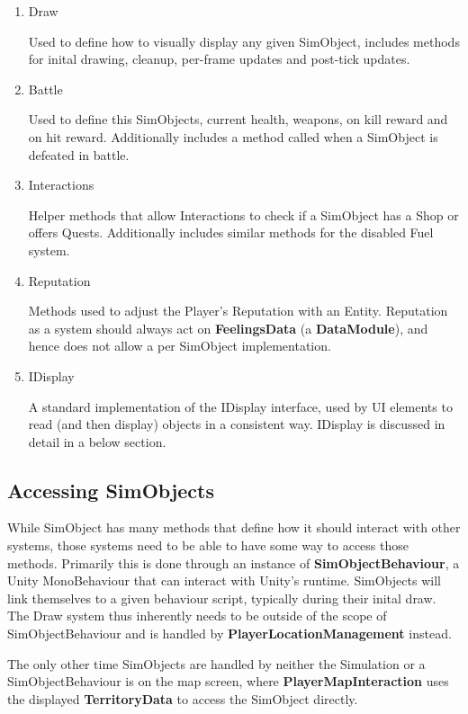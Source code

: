 \documentclass{report}
\begin{document}
\begin{enumerate}
        \item Draw

Used to define how to visually display any given SimObject, includes methods for inital drawing, cleanup, per-frame updates and post-tick updates.

        \item Battle

Used to define this SimObjects, current health, weapons, on kill reward and on hit reward. Additionally includes a method called when a SimObject is defeated in battle.

        \item Interactions

Helper methods that allow Interactions to check if a SimObject has a Shop or offers Quests. Additionally includes similar methods for the disabled Fuel system.

        \item Reputation

Methods used to adjust the Player's Reputation with an Entity. Reputation as a system should always act on \textbf{FeelingsData} (a \textbf{DataModule}), and hence does not allow a per SimObject implementation. 

	\item IDisplay

A standard implementation of the IDisplay interface, used by UI elements to read (and then display) objects in a consistent way. IDisplay is discussed in detail in a below section.

\end{enumerate}

\subsection{Accessing SimObjects}

While SimObject has many methods that define how it should interact with other systems, those systems need to be able to have some way to access those methods. Primarily this is done through an instance of \textbf{SimObjectBehaviour}, a Unity MonoBehaviour that can interact with Unity's runtime. SimObjects will link themselves to a given behaviour script, typically during their inital draw. The Draw system thus inherently needs to be outside of the scope of SimObjectBehaviour and is handled by \textbf{PlayerLocationManagement} instead.

The only other time SimObjects are handled by neither the Simulation or a SimObjectBehaviour is on the map screen, where \textbf{PlayerMapInteraction} uses the displayed \textbf{TerritoryData} to access the SimObject directly.
\end{document}
